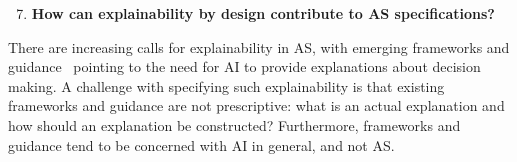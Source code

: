 \documentclass[sigconf,nonacm]{acmart}%
\begin{document}
	
	\begin{enumerate}[leftmargin=0.5cm]
		\setcounter{enumi}{6}
		\item \textbf{How can explainability by design contribute to AS specifications?}
	\end{enumerate} 	
	There are increasing calls for explainability in AS, with emerging frameworks and guidance~\cite{Hamon:2020} pointing to the need for AI to provide explanations about decision making. A challenge with specifying such explainability is that existing frameworks and guidance are not prescriptive: what is an actual explanation and how should an explanation be constructed? Furthermore, frameworks and guidance tend to be concerned with AI in general, and not AS.
	
\end{document}
